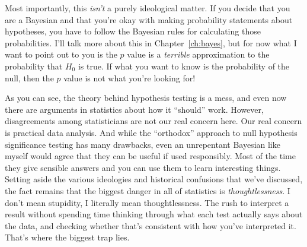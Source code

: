 Most importantly, this {\it isn't} a purely ideological matter. If you decide that you are a Bayesian and that you're okay with making probability statements about hypotheses, you have to follow the Bayesian rules for calculating those probabilities. I'll talk more about this in Chapter~\ref{ch:bayes}, but for now what I want to point out to you is the $p$ value is a {\it terrible} approximation to the probability that $H_0$ is true. If what you want to know is the probability of the null, then the $p$ value is not what you're looking for!


As you can see, the theory behind hypothesis testing is a mess, and even now there are arguments in statistics about how it ``should'' work. However, disagreements among statisticians are not our real concern here. Our real concern is practical data analysis. And while the ``orthodox'' approach to null hypothesis significance testing has many drawbacks, even an unrepentant Bayesian like myself would agree that they can be useful if used responsibly. Most of the time they give sensible answers and you can use them to learn interesting things. Setting aside the various ideologies and historical confusions that we've discussed, the fact remains that the biggest danger in all of statistics is {\it thoughtlessness}. I don't mean stupidity, I literally mean thoughtlessness. The rush to interpret a result without spending time thinking through what each test actually says about the data, and checking whether that's consistent with how you've interpreted it. That's where the biggest trap lies. 

